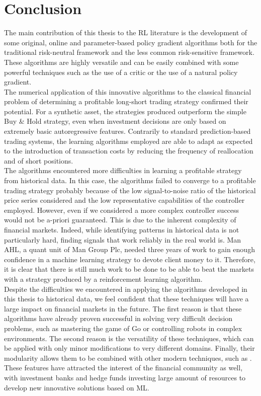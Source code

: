 \section{Conclusion}
The main contribution of this thesis to the \gls{RL} literature is the development of some original, online and parameter-based policy gradient algorithms both for the traditional risk-neutral framework and the less common risk-sensitive framework. These algorithms are highly versatile and can be easily combined with some powerful techniques such as the use of a critic or the use of a natural policy gradient.\\
The numerical application of this innovative algorithms to the classical financial problem of determining a profitable long-short trading strategy confirmed their potential. For a synthetic asset, the strategies produced outperform the simple Buy \& Hold strategy, even when investment decisions are only based on extremely basic autoregressive features. Contrarily to standard prediction-based trading systems, the learning algorithms employed are able to adapt as expected to the introduction of transaction costs by reducing the frequency of reallocation and of short positions.\\
The algorithms encountered more difficulties in learning a profitable strategy from historical data. In this case, the algorithms failed to converge to a profitable trading strategy probably because of the low signal-to-noise ratio of the historical price series considered and the low representative capabilities of the controller employed. However, even if we considered a more complex controller success would not be a-priori guaranteed. This is due to the inherent complexity of financial markets. Indeed, while identifying patterns in historical data is not particularly hard, finding signals that work reliably in the real world is. Man AHL, a quant unit of Man Group Plc, needed three years of work to gain enough confidence in a machine learning strategy to devote client money to it. Therefore, it is clear that there is still much work to be done to be able to beat the markets with a strategy produced by a reinforcement learning algorithm.\\
Despite the difficulties we encountered in applying the algorithms developed in this thesis to historical data, we feel confident that these techniques will have a large impact on financial markets in the future. The first reason is that these algorithms have already proven successful in solving very difficult decision problems, such as mastering the game of Go or controlling robots in complex environments. The second reason is the versatility of these techniques, which can be applied with only minor modifications to very different domains. Finally, their modularity allows them to be combined with other modern techniques, such as . These features have attracted the interest of the financial community as well, with investment banks and hedge funds investing large amount of resources to develop new innovative solutions based on \gls{ML}. 
 
